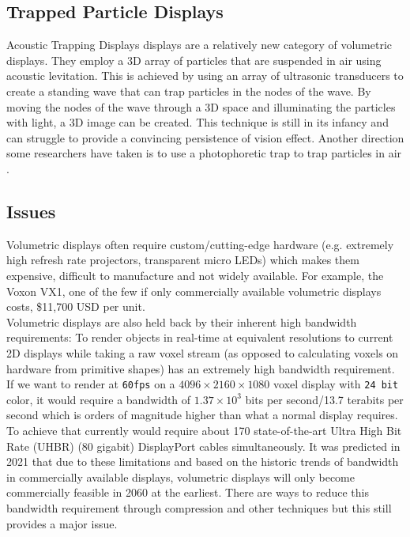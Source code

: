 \subsection{Trapped Particle Displays}
Acoustic Trapping Displays displays are a relatively new category of volumetric displays. They employ a 3D array of particles that are suspended in air using acoustic levitation. \cite{10.1063/1.5113467} \cite{Hirayama2019} This is achieved by using an array of ultrasonic transducers to create a standing wave that can trap particles in the nodes of the wave. By moving the nodes of the wave through a 3D space and illuminating the particles with light, a 3D image can be created. This technique is still in its infancy and can struggle to provide a convincing persistence of vision effect. Another direction some researchers have taken is to use a photophoretic trap to trap particles in air \cite{Smalley2018}.

\subsection{Issues}

Volumetric displays often require custom/cutting-edge hardware (e.g. extremely high refresh rate projectors,  transparent micro LEDs) which makes them expensive, difficult to manufacture and not widely available. For example, the Voxon VX1, one of the few if only commercially available volumetric displays costs, \$11,700 USD \cite{noauthor_products_nodate} per unit. \\

Volumetric displays are also held back by their inherent high bandwidth requirements: To render objects in real-time at equivalent resolutions to current 2D displays while taking a raw voxel stream (as opposed to calculating voxels on hardware from primitive shapes) has an extremely high bandwidth requirement. If we want to render at \texttt{60fps} on a $4096 \times 2160 \times 1080$ voxel display with \texttt{24 bit} color, it would require a bandwidth of $1.37 \times 10^3$ bits per second/13.7 terabits per second which is orders of magnitude higher than what a normal display requires. To achieve that currently would require about 170 state-of-the-art Ultra High Bit Rate (UHBR) (80 gigabit) DisplayPort cables simultaneously. It was predicted in 2021 \cite{LAM2021050011} that due to these limitations and based on the historic trends of bandwidth in commercially available displays, volumetric displays will only become commercially feasible in 2060 at the earliest. There are ways to reduce this bandwidth requirement through compression and other techniques \cite{4487481} but this still provides a major issue. \\

